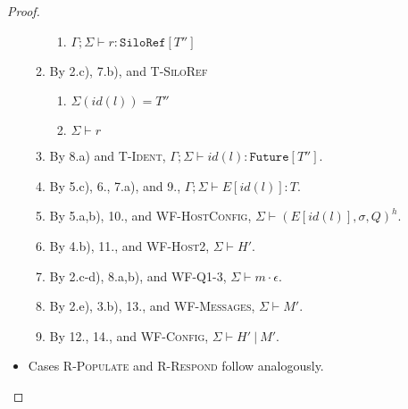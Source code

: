 \begin{proof}
\begin{itemize}
\begin{enumerate}
\begin{enumerate}[label=(\alph*)]
  \item $\Gamma ; \Sigma \vdash r : \texttt{SiloRef}[T'']$
  \end{enumerate}
\item By 2.c), 7.b), and \textsc{T-SiloRef}
  \begin{enumerate}[label=(\alph*)]
  \item $\Sigma(id(l)) = T''$
  \item $\Sigma \vdash r$
  \end{enumerate}
\item By 8.a) and \textsc{T-Ident}, $\Gamma ; \Sigma \vdash id(l) : \texttt{Future}[T'']$.
\item By 5.c), 6., 7.a), and 9., $\Gamma ; \Sigma \vdash E[id(l)] : T$.
\item By 5.a,b), 10., and \textsc{WF-HostConfig}, $\Sigma \vdash (E[id(l)], \sigma, Q)^h$.
\item By 4.b), 11., and \textsc{WF-Host2}, $\Sigma \vdash H'$.
\item By 2.c-d), 8.a,b), and \textsc{WF-Q1-3}, $\Sigma \vdash m \cdot \epsilon$.
\item By 2.e), 3.b), 13., and \textsc{WF-Messages}, $\Sigma \vdash M'$.
\item By 12., 14., and \textsc{WF-Config}, $\Sigma \vdash H'~|~M'$.
\end{enumerate}

\item Cases \textsc{R-Populate} and \textsc{R-Respond} follow analogously.


\end{itemize}
\end{proof}
